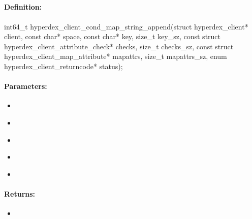 \pagebreak
\subsection{}
\label{api:c:cond_map_string_append}


\paragraph{Definition:}
\begin{ccode}
int64_t hyperdex_client_cond_map_string_append(struct hyperdex_client* client,
        const char* space,
        const char* key, size_t key_sz,
        const struct hyperdex_client_attribute_check* checks, size_t checks_sz,
        const struct hyperdex_client_map_attribute* mapattrs, size_t mapattrs_sz,
        enum hyperdex_client_returncode* status);
\end{ccode}

\paragraph{Parameters:}
\begin{itemize}[noitemsep]
\item {}\\

\item {}\\

\item {}\\

\item {}\\

\item {}\\

\end{itemize}

\paragraph{Returns:}
\begin{itemize}[noitemsep]
\item {}\\

\end{itemize}

